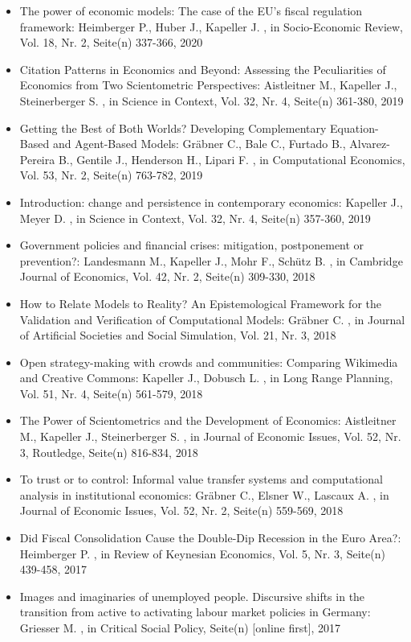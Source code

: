 \begin{itemize}
\item The power of economic models: The case of the EU's fiscal regulation framework: Heimberger P., Huber J., Kapeller J. , in Socio-Economic Review, Vol. 18, Nr. 2, Seite(n) 337-366, 2020
\item Citation Patterns in Economics and Beyond: Assessing the Peculiarities of Economics from Two Scientometric Perspectives: Aistleitner M., Kapeller J., Steinerberger S. , in Science in Context, Vol. 32, Nr. 4, Seite(n) 361-380, 2019
\item Getting the Best of Both Worlds? Developing Complementary Equation-Based and Agent-Based Models: Gräbner C., Bale C., Furtado B., Alvarez-Pereira B., Gentile J., Henderson H., Lipari F. , in Computational Economics, Vol. 53, Nr. 2, Seite(n) 763-782, 2019
\item Introduction: change and persistence in contemporary economics: Kapeller J., Meyer D. , in Science in Context, Vol. 32, Nr. 4, Seite(n) 357-360, 2019
\item Government policies and financial crises: mitigation, postponement or prevention?: Landesmann M., Kapeller J., Mohr F., Schütz B. , in Cambridge Journal of Economics, Vol. 42, Nr. 2, Seite(n) 309-330, 2018
\item How to Relate Models to Reality? An Epistemological Framework for the Validation and Verification of Computational Models: Gräbner C. , in Journal of Artificial Societies and Social Simulation, Vol. 21, Nr. 3, 2018
\item Open strategy-making with crowds and communities: Comparing Wikimedia and Creative Commons: Kapeller J., Dobusch L. , in Long Range Planning, Vol. 51, Nr. 4, Seite(n) 561-579, 2018
\item The Power of Scientometrics and the Development of Economics: Aistleitner M., Kapeller J., Steinerberger S. , in Journal of Economic Issues, Vol. 52, Nr. 3, Routledge, Seite(n) 816-834, 2018
\item To trust or to control: Informal value transfer systems and computational analysis in institutional economics: Gräbner C., Elsner W., Lascaux A. , in Journal of Economic Issues, Vol. 52, Nr. 2, Seite(n) 559-569, 2018
\item Did Fiscal Consolidation Cause the Double-Dip Recession in the Euro Area?: Heimberger P. , in Review of Keynesian Economics, Vol. 5, Nr. 3, Seite(n) 439-458, 2017
\item Images and imaginaries of unemployed people. Discursive shifts in the transition from active to activating labour market policies in Germany: Griesser M. , in Critical Social Policy, Seite(n) [online first], 2017

\end{itemize}
